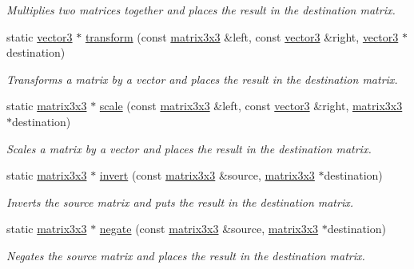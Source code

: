 \begin{DoxyCompactItemize}
\begin{DoxyCompactList}\small\item\em Multiplies two matrices together and places the result in the destination matrix. \end{DoxyCompactList}\item 
static \hyperlink{classflounder_1_1vector3}{vector3} $\ast$ \hyperlink{classflounder_1_1matrix3x3_a2dac915fcc72afd4016f3b22086f6294}{transform} (const \hyperlink{classflounder_1_1matrix3x3}{matrix3x3} \&left, const \hyperlink{classflounder_1_1vector3}{vector3} \&right, \hyperlink{classflounder_1_1vector3}{vector3} $\ast$destination)
\begin{DoxyCompactList}\small\item\em Transforms a matrix by a vector and places the result in the destination matrix. \end{DoxyCompactList}\item 
static \hyperlink{classflounder_1_1matrix3x3}{matrix3x3} $\ast$ \hyperlink{classflounder_1_1matrix3x3_a3686f4eacc8d164c69afd7509a3e48e0}{scale} (const \hyperlink{classflounder_1_1matrix3x3}{matrix3x3} \&left, const \hyperlink{classflounder_1_1vector3}{vector3} \&right, \hyperlink{classflounder_1_1matrix3x3}{matrix3x3} $\ast$destination)
\begin{DoxyCompactList}\small\item\em Scales a matrix by a vector and places the result in the destination matrix. \end{DoxyCompactList}\item 
static \hyperlink{classflounder_1_1matrix3x3}{matrix3x3} $\ast$ \hyperlink{classflounder_1_1matrix3x3_a894192d848137b9261503b6b9b203fd3}{invert} (const \hyperlink{classflounder_1_1matrix3x3}{matrix3x3} \&source, \hyperlink{classflounder_1_1matrix3x3}{matrix3x3} $\ast$destination)
\begin{DoxyCompactList}\small\item\em Inverts the source matrix and puts the result in the destination matrix. \end{DoxyCompactList}\item 
static \hyperlink{classflounder_1_1matrix3x3}{matrix3x3} $\ast$ \hyperlink{classflounder_1_1matrix3x3_a3a464138550b479c57f034658b9528b7}{negate} (const \hyperlink{classflounder_1_1matrix3x3}{matrix3x3} \&source, \hyperlink{classflounder_1_1matrix3x3}{matrix3x3} $\ast$destination)
\begin{DoxyCompactList}\small\item\em Negates the source matrix and places the result in the destination matrix. \end{DoxyCompactList}\item 

\end{DoxyCompactItemize}
